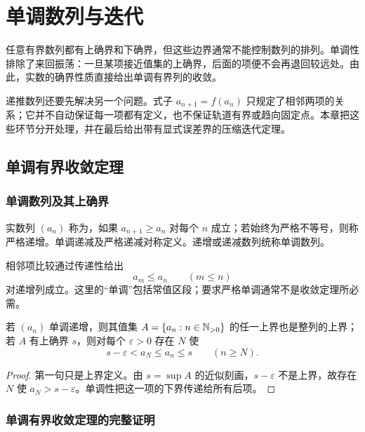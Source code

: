 \chapter{单调数列与迭代}
\label{chap:monotone-iteration}
\label{chap:monotone-recursive-sequences}

任意有界数列都有上确界和下确界，但这些边界通常不能控制数列的排列。单调性排除了来回振荡：一旦某项接近值集的上确界，后面的项便不会再退回较远处。由此，实数的确界性质直接给出单调有界列的收敛。

递推数列还要先解决另一个问题。式子 \(a_{n+1}=f(a_n)\) 只规定了相邻两项的关系；它并不自动保证每一项都有定义，也不保证轨道有界或趋向固定点。本章把这些环节分开处理，并在最后给出带有显式误差界的压缩迭代定理。

\section{单调有界收敛定理}

\subsection{单调数列及其上确界}


\begin{definition}
实数列 \((a_n)\) 称为，如果 \(a_{n+1}\ge a_n\) 对每个 \(n\) 成立；若始终为严格不等号，则称严格递增。单调递减及严格递减对称定义。递增或递减数列统称单调数列。
\end{definition}

相邻项比较通过传递性给出
\[
 a_m\le a_n\qquad(m\le n)
\]
对递增列成立。这里的“单调”包括常值区段；要求严格单调通常不是收敛定理所必需。

\begin{proposition}
若 \((a_n)\) 单调递增，则其值集 \(A=\{a_n:n\in\mathbb{N}_{>0}\}\) 的任一上界也是整列的上界；若 \(A\) 有上确界 \(s\)，则对每个 \(\varepsilon>0\) 存在 \(N\) 使
\[
 s-\varepsilon<a_N\le a_n\le s\qquad(n\ge N).
\]
\end{proposition}

\begin{proof}
第一句只是上界定义。由 \(s=\sup A\) 的近似刻画，\(s-\varepsilon\) 不是上界，故存在 \(N\) 使 \(a_N>s-\varepsilon\)。单调性把这一项的下界传递给所有后项。
\end{proof}

\subsection{单调有界收敛定理的完整证明}


